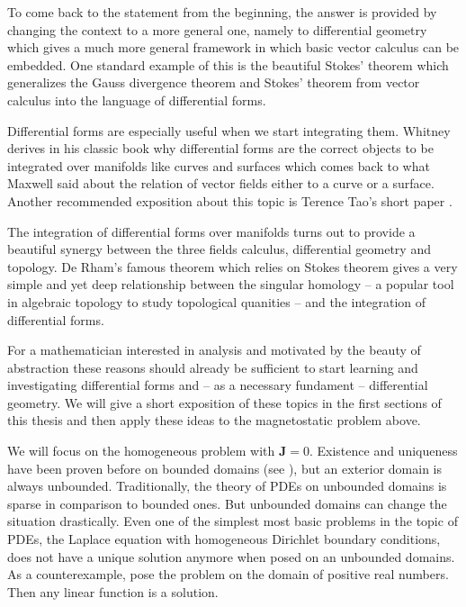 \documentclass[../master_thesis.tex]{subfiles}
\begin{document}
To come back to the statement from the beginning, the answer is provided 
by changing the context to a more general one, namely to differential geometry which
gives a much more general framework in which basic vector calculus can 
be embedded. One standard example of this is the beautiful Stokes' theorem 
which generalizes the Gauss divergence theorem and Stokes' theorem from vector calculus 
into the language of differential forms.

Differential forms are especially useful when we start integrating them. 
Whitney derives in his classic book \cite{whitney} why differential forms are
the correct objects to be integrated over manifolds like curves and surfaces which comes back 
to what Maxwell said about the relation 
of vector fields either to a curve or a surface. 
Another recommended exposition about this topic is Terence Tao's short paper \cite{terence_tao}. 

The integration of differential forms over manifolds turns out to provide 
a beautiful synergy between the three fields 
calculus, differential geometry and topology. De Rham's famous theorem which 
relies on Stokes theorem 
gives a very simple and yet deep relationship between the singular homology -- 
a popular tool in algebraic topology to study topological quanities -- 
and the integration of differential forms.

For a mathematician interested in analysis and motivated by the beauty of abstraction 
these reasons should already be sufficient to start learning and investigating 
differential forms and -- as a necessary fundament -- differential geometry. We will 
give a short exposition of these topics in the first sections of this thesis 
and then apply these ideas to the magnetostatic problem above.

We will focus on the homogeneous problem with $\mathbf{J} = 0$.
Existence and uniqueness have been proven before on bounded domains 
(see \cite[Thm.\,5.4]{mitrea_layer_potentials}),
but an exterior domain is always unbounded. 
Traditionally, the theory of PDEs on unbounded domains 
is sparse in comparison to bounded ones. But unbounded domains can change the 
situation drastically. Even one of the simplest most basic problems in the topic 
of PDEs, the Laplace equation with homogeneous Dirichlet boundary conditions, does not 
have a unique solution anymore when posed on an unbounded domains. As a counterexample,
pose the problem on the domain of positive real numbers. Then any linear function 
is a solution.
\end{document}
